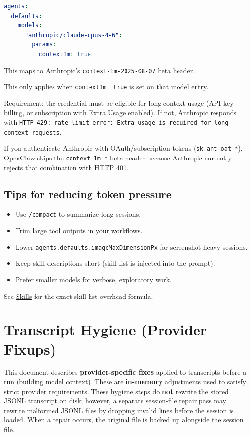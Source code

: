 \begin{lstlisting}[language=yaml]
agents:
  defaults:
    models:
      "anthropic/claude-opus-4-6":
        params:
          context1m: true
\end{lstlisting}


This maps to Anthropic's \texttt{context-1m-2025-08-07} beta header.

This only applies when \texttt{context1m: true} is set on that model entry.

Requirement: the credential must be eligible for long-context usage (API key
billing, or subscription with Extra Usage enabled). If not, Anthropic responds
with \texttt{HTTP 429: rate\_limit\_error: Extra usage is required for long context requests}.

If you authenticate Anthropic with OAuth/subscription tokens (\texttt{sk-ant-oat-*}),
OpenClaw skips the \texttt{context-1m-*} beta header because Anthropic currently
rejects that combination with HTTP 401.

\subsection{Tips for reducing token pressure}


\begin{itemize}
  \item Use \texttt{/compact} to summarize long sessions.
  \item Trim large tool outputs in your workflows.
  \item Lower \texttt{agents.defaults.imageMaxDimensionPx} for screenshot-heavy sessions.
  \item Keep skill descriptions short (skill list is injected into the prompt).
  \item Prefer smaller models for verbose, exploratory work.
\end{itemize}


See \href{/tools/skills}{Skills} for the exact skill list overhead formula.


\clearpage

\section{Transcript Hygiene (Provider Fixups)}


This document describes \textbf{provider-specific fixes} applied to transcripts before a run
(building model context). These are \textbf{in-memory} adjustments used to satisfy strict
provider requirements. These hygiene steps do \textbf{not} rewrite the stored JSONL transcript
on disk; however, a separate session-file repair pass may rewrite malformed JSONL files
by dropping invalid lines before the session is loaded. When a repair occurs, the original
file is backed up alongside the session file.

